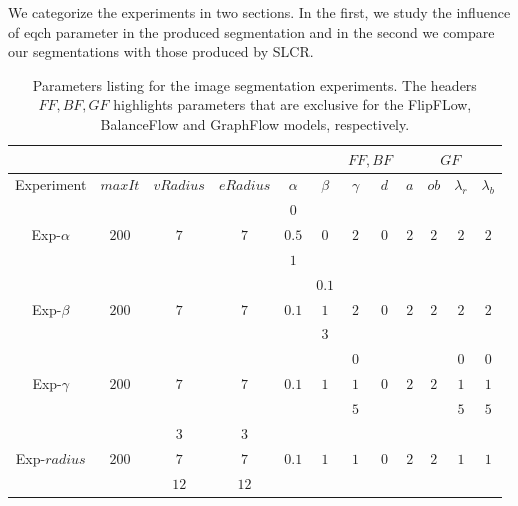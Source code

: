 We categorize the experiments in two sections. In the first, we study the influence of eqch parameter in the produced segmentation and in the second we compare our segmentations with those produced by SLCR.


\begin{table}
\centering
\begin{tabular}{|c|c|c|c|c|c|c|c|c|c|c|c|}
\cline{7-12}
\multicolumn{6}{c|}{} & \multicolumn{2}{|c|}{$FF,BF$} & \multicolumn{4}{|c|}{$GF$}\\
\hline
Experiment & $maxIt$ & $vRadius$ & $eRadius$ & $\alpha$ & $\beta$  & $\gamma$ & $d$ & $a$ & $ob$ & $\lambda_r$ & $\lambda_b$ \\
\hline
\multirow{3}{*}{Exp-$\alpha$} & \multirow{3}{*}{$200$} & \multirow{3}{*}{$7$} & \multirow{3}{*}{$7$} & $0$ & \multirow{3}{*}{$0$} & \multirow{3}{*}{$2$} & \multirow{3}{*}{$0$} & \multirow{3}{*}{$2$} & \multirow{3}{*}{$2$} & \multirow{3}{*}{$2$} & \multirow{3}{*}{$2$} \\
&  & & & $0.5$ & & & & & & &\\
&  & & & $1$ & & & & & & &\\
\hline
\multirow{3}{*}{Exp-$\beta$} & \multirow{3}{*}{$200$} & \multirow{3}{*}{$7$} & \multirow{3}{*}{$7$} & \multirow{3}{*}{$0.1$} & $0.1$ & \multirow{3}{*}{$2$} & \multirow{3}{*}{$0$} & \multirow{3}{*}{$2$} & \multirow{3}{*}{$2$} & \multirow{3}{*}{$2$} & \multirow{3}{*}{$2$} \\
&  & & & & $1$ & & & & & &\\
&  & & & & $3$ & & & & & &\\
\hline
\multirow{3}{*}{Exp-$\gamma$} & \multirow{3}{*}{$200$} & \multirow{3}{*}{$7$} & \multirow{3}{*}{$7$} & \multirow{3}{*}{$0.1$} & \multirow{3}{*}{$1$} & $0$ & \multirow{3}{*}{$0$} & \multirow{3}{*}{$2$} & \multirow{3}{*}{$2$} & $0$ & $0$ \\
&  & & & & & $1$ & & & & $1$ & $1$\\
&  & & & & & $5$ & & & & $5$ & $5$\\
\hline
\multirow{3}{*}{Exp-$radius$} & \multirow{3}{*}{$200$} & $3$ & $3$ & \multirow{3}{*}{$0.1$} & \multirow{3}{*}{$1$} & \multirow{3}{*}{$1$} & \multirow{3}{*}{$0$} & \multirow{3}{*}{$2$} & \multirow{3}{*}{$2$} & \multirow{3}{*}{$1$} & \multirow{3}{*}{$1$} \\
&  & $7$ & $7$ & & & & & & & & \\
&  & $12$ & $12$ & & & & & & & & \\
\hline
\end{tabular}
\caption{Parameters listing for the image segmentation experiments. The headers $FF,BF,GF$ highlights parameters that are exclusive for the FlipFLow, BalanceFlow and GraphFlow models, respectively.}
\label{tab:image-segmentation-parameters-summary}
\end{table}

